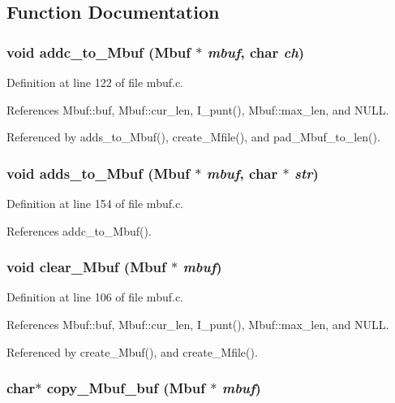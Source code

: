 \subsection{Function Documentation}
\subsubsection{\setlength{\rightskip}{0pt plus 5cm}void addc\_\-to\_\-Mbuf (\bf{Mbuf} $\ast$ {\em mbuf}, char {\em ch})}\label{mbuf_8h_c484945110f25490ddf1f1cee837545a}




Definition at line 122 of file mbuf.c.

References Mbuf::buf, Mbuf::cur\_\-len, I\_\-punt(), Mbuf::max\_\-len, and NULL.

Referenced by adds\_\-to\_\-Mbuf(), create\_\-Mfile(), and pad\_\-Mbuf\_\-to\_\-len().
\subsubsection{\setlength{\rightskip}{0pt plus 5cm}void adds\_\-to\_\-Mbuf (\bf{Mbuf} $\ast$ {\em mbuf}, char $\ast$ {\em str})}\label{mbuf_8h_69f1edaf9698fff3c71661de842e77a5}




Definition at line 154 of file mbuf.c.

References addc\_\-to\_\-Mbuf().
\subsubsection{\setlength{\rightskip}{0pt plus 5cm}void clear\_\-Mbuf (\bf{Mbuf} $\ast$ {\em mbuf})}\label{mbuf_8h_5622b2609033c4d9593f1e930efc6de1}




Definition at line 106 of file mbuf.c.

References Mbuf::buf, Mbuf::cur\_\-len, I\_\-punt(), Mbuf::max\_\-len, and NULL.

Referenced by create\_\-Mbuf(), and create\_\-Mfile().
\subsubsection{\setlength{\rightskip}{0pt plus 5cm}char$\ast$ copy\_\-Mbuf\_\-buf (\bf{Mbuf} $\ast$ {\em mbuf})}\label{mbuf_8h_86e194177b3d1029d56c24a08ff0e288}




